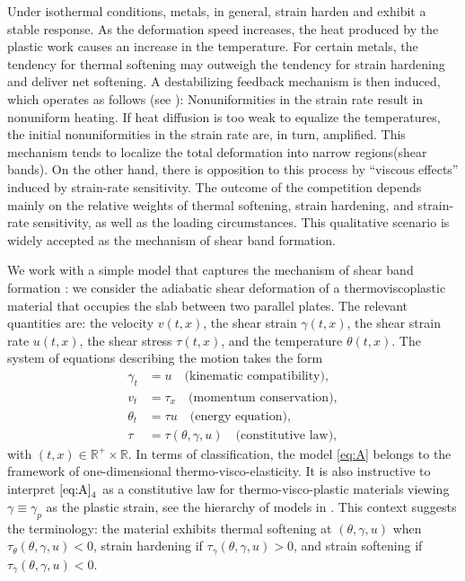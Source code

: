 \documentclass[graybox]{svmult}
\begin{document}
Under isothermal conditions, metals, in general, strain harden and exhibit a stable response. As the deformation speed increases, the heat produced by the plastic work causes an increase in the temperature. For certain metals, the tendency for thermal softening may outweigh the tendency for strain hardening and deliver net softening. A destabilizing feedback mechanism is then induced, which operates as follows (see \cite{CDHS}): Nonuniformities in the strain rate result in nonuniform heating. If heat diffusion is too weak to equalize the temperatures, the initial nonuniformities in the strain rate are, in turn, amplified. This mechanism tends to localize the total deformation into narrow regions(shear bands). On the other hand, there is opposition to this process by ``viscous effects'' induced by strain-rate sensitivity. The outcome of the competition depends mainly on the relative weights of thermal softening, strain hardening, and strain-rate sensitivity, as well as the loading circumstances. This qualitative scenario is widely accepted as the mechanism of shear band formation. 


We work with a simple model that captures the mechanism of shear band formation : we consider the  adiabatic shear deformation  of a  thermoviscoplastic material that occupies the slab between two parallel plates. The relevant quantities are: the velocity $v(t,x)$, the shear strain $\gamma(t,x)$, 
 the shear strain rate $u(t,x)$, the shear stress $\tau(t,x)$,  and the temperature $\theta(t,x)$. The system of equations describing the motion takes the form
\begin{equation} \label{eq:A}\tag{A}
\begin{aligned}
 \gamma_t &= u \quad \text{(kinematic compatibility)}, 	\\
 v_t &= \tau_x \quad \text{(momentum conservation)}, 	\\
 \theta_t &= \tau u \quad \text{(energy equation)},	\\
 \tau &=\tau(\theta,\gamma,u) \quad \text{(constitutive law)},			
\end{aligned}
\end{equation}
with $(t,x) \in \mathbb{R}^+\times \mathbb{R}$. In terms of classification, the model \eqref{eq:A} belongs to the framework of one-dimensional thermo-visco-elasticity. 
It is also instructive to interpret $\eqref{eq:A}_4$ as a constitutive law for thermo-visco-plastic materials 
viewing $\gamma \equiv \gamma_p$ as the plastic strain, see the hierarchy of models in \cite{KT09,tzavaras_nonlinear_1992}.
This context suggests the terminology: the material exhibits thermal softening at $(\theta,\gamma,u)$ when $\tau_\theta(\theta,\gamma,u)<0$, strain hardening if $\tau_\gamma(\theta,\gamma,u)>0$, and strain softening if $\tau_\gamma(\theta,\gamma,u)<0$.
\end{document}
